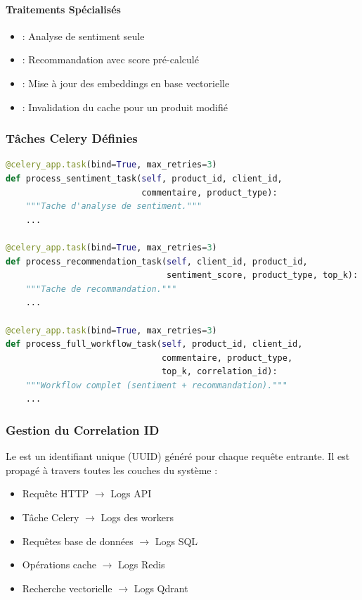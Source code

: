 \documentclass[11pt,a4paper]{report}
\begin{document}
\paragraph{Traitements Spécialisés}
\begin{itemize}
    \item {} : Analyse de sentiment seule
    \item {} : Recommandation avec score pré-calculé
    \item {} : Mise à jour des embeddings en base vectorielle
    \item {} : Invalidation du cache pour un produit modifié
\end{itemize}

\subsubsection{Tâches Celery Définies}

\begin{lstlisting}[language=Python, caption={Exemples de tâches Celery}, label={lst:celery_tasks}]
@celery_app.task(bind=True, max_retries=3)
def process_sentiment_task(self, product_id, client_id,
                           commentaire, product_type):
    """Tache d'analyse de sentiment."""
    ...

@celery_app.task(bind=True, max_retries=3)
def process_recommendation_task(self, client_id, product_id,
                                sentiment_score, product_type, top_k):
    """Tache de recommandation."""
    ...

@celery_app.task(bind=True, max_retries=3)
def process_full_workflow_task(self, product_id, client_id,
                               commentaire, product_type,
                               top_k, correlation_id):
    """Workflow complet (sentiment + recommandation)."""
    ...
\end{lstlisting}

\subsubsection{Gestion du Correlation ID}

Le  est un identifiant unique (UUID) généré pour chaque requête entrante. Il est propagé à travers toutes les couches du système :

\begin{itemize}
    \item Requête HTTP $\rightarrow$ Logs API
    \item Tâche Celery $\rightarrow$ Logs des workers
    \item Requêtes base de données $\rightarrow$ Logs SQL
    \item Opérations cache $\rightarrow$ Logs Redis
    \item Recherche vectorielle $\rightarrow$ Logs Qdrant
\end{itemize}
\end{document}
